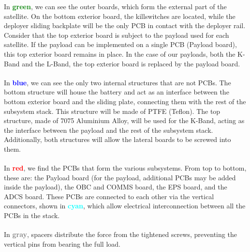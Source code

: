 In \textbf{\textcolor{green}{green}}, we can see the outer boards, which form the
external part of the satellite. On the bottom exterior board, the 
killswitches are located, while the deployer sliding backplate will be the only PCB in
contact with the deployer rail. Consider that the top exterior board 
is subject to the payload used for each satellite. If the payload 
can be implemented on a single PCB (Payload board), this top exterior 
board remains in place. In the case of our payloads, both the K-Band
and the L-Band, the top exterior board is replaced by the payload board.

\paragraph{}

In \textbf{\textcolor{blue}{blue}}, we can see the only two internal structures 
that are not PCBs. The bottom structure will house the battery and act as an 
interface between the bottom exterior board and the sliding plate, connecting 
them with the rest of the subsystem stack. This structure will be made of PTFE
(Teflon). The top structure, made of 7075 Aluminium Alloy, will be used for 
the K-Band, acting as the interface between the payload and the rest of the 
subsystem stack. Additionally, both structures will allow the lateral boards 
to be screwed into them.

\paragraph{}

In \textbf{\textcolor{red}{red}}, we find the PCBs that form the various subsystems.
From top to bottom, these are: the Payload board (for the payload, additional PCBs 
may be added inside the payload), the OBC and COMMS board, the EPS board, and the 
ADCS board. These PCBs are connected to each other via the vertical connectors,
shown in \textbf{\textcolor{cyan}{cyan}}, which allow electrical interconnection 
between all the PCBs in the stack.
\paragraph{}

In \textbf{\textcolor{gray}{gray}}, spacers distribute the force from the 
tightened screws, preventing the vertical pins from bearing the full load.
\paragraph{}

